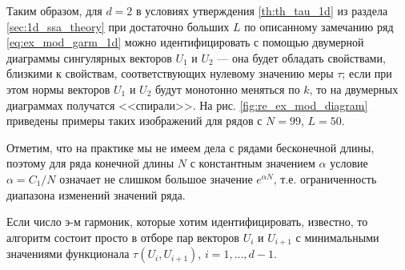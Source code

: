 \documentclass[specialist,
               substylefile = spbu.rtx,
               subf,href,colorlinks=true, 12pt]{disser}
\begin{document}
Таким образом, для $d=2$ в условиях утверждения \ref{th:th_tau_1d} из раздела \ref{sec:1d_ssa_theory} при достаточно больших $L$ по описанному замечанию ряд \eqref{eq:ex_mod_garm_1d} можно идентифицировать с помощью двумерной диаграммы сингулярных векторов $U_1$ и $U_2$ --- она будет обладать свойствами, близкими к свойствам, соответствующих нулевому значению меры $\tau$; если при этом нормы векторов $U_1$ и $U_2$ будут монотонно меняться по $k$, то на двумерных диаграммах получатся <<спирали>>. На рис. \ref{fig:re_ex_mod_diagram} приведены примеры таких изображений для рядов с $N=99$, $L=50$. 


Отметим, что на практике мы не имеем дела с рядами бесконечной длины, поэтому для ряда конечной длины $N$ с константным значением $\alpha$ условие $\alpha = C_1/N$ означает не слишком большое значение $e^{\alpha N}$, т.е. ограниченность диапазона изменений значений ряда.


Если число э-м гармоник, которые хотим идентифицировать, известно, то алгоритм состоит просто в отборе пар векторов $U_i$ и $U_{i+1}$ с минимальными значениями функционала  $\tau(U_i, U_{i+1})$, $i=1,\ldots, d-1$.
\end{document}
